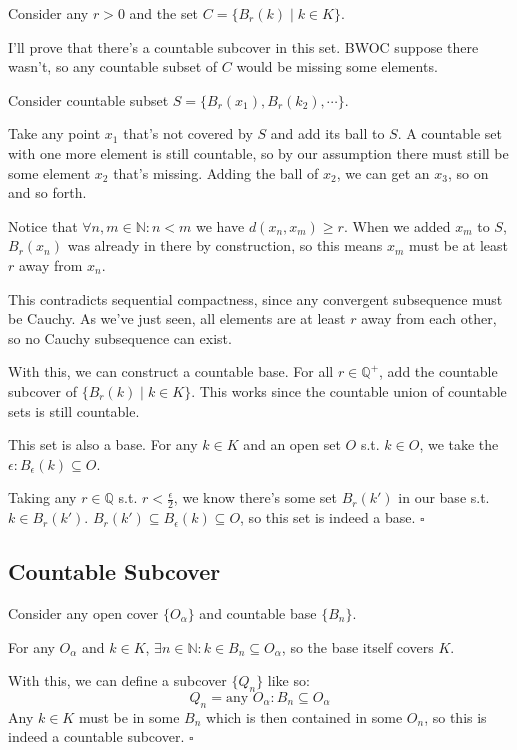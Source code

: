 \documentclass[12pt]{article}
\newcommand{\N}{\mathbb{N}}
\newcommand{\Q}{\mathbb{Q}}
\begin{document}
Consider any $r > 0$ and the set $C=\{B_r(k) \mid k \in K\}$.

I'll prove that there's a countable subcover in this set.
BWOC suppose there wasn't, so any countable subset of $C$ would be missing some elements.

Consider countable subset $S=\{B_r(x_1), B_r(k_2), \cdots\}$.

Take any point $x_1$ that's not covered by $S$ and add its ball to $S$.
A countable set with one more element is still countable, so by our assumption
there must still be some element $x_2$ that's missing.
Adding the ball of $x_2$, we can get an $x_3$, so on and so forth.

Notice that $\forall n, m \in \N: n < m$ we have $d(x_n, x_m) \ge r$.
When we added $x_m$ to $S$, $B_r(x_n)$ was already in there by construction,
so this means $x_m$ must be at least $r$ away from $x_n$. 

This contradicts sequential compactness, since any convergent subsequence must be Cauchy.
As we've just seen, all elements are at least $r$ away from each other, so
no Cauchy subsequence can exist.

With this, we can construct a countable base.
For all $r \in \Q^+$, add the countable subcover of $\{B_r(k) \mid k \in K\}$.
This works since the countable union of countable sets is still countable.

This set is also a base.
For any $k \in K$ and an open set $O$ s.t. $k \in O$,
we take the $\epsilon: B_\epsilon(k) \subseteq O$.

Taking any $r \in \Q$ s.t. $r < \frac{\epsilon}{2}$,
we know there's some set $B_r(k')$ in our base s.t. $k \in B_r(k')$.
$B_r(k') \subseteq B_\epsilon(k) \subseteq O$, so this set is indeed a base. $\square$

\subsection{Countable Subcover}

Consider any open cover $\{O_\alpha\}$ and countable base $\{B_n\}$.

For any $O_\alpha$ and $k \in K$, $\exists n \in \N: k \in B_n \subseteq O_\alpha$,
so the base itself covers $K$.

With this, we can define a subcover $\{Q_n\}$ like so:
\[Q_n = \text{any } O_\alpha: B_n \subseteq O_\alpha\]
Any $k \in K$ must be in some $B_n$ which is then contained in some $O_n$,
so this is indeed a countable subcover. $\square$
\end{document}
